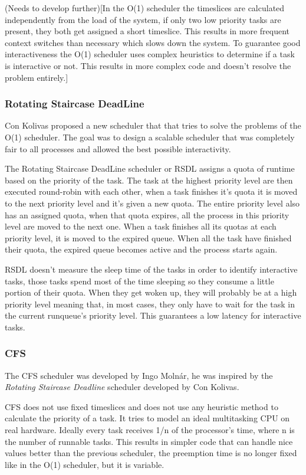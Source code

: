\documentclass[10pt]{book}
\begin{document}
(Needs to develop further)[In the O(1) scheduler the timeslices are calculated independently from the load of the system, if only two low priority tasks are present, they both get assigned a short timeslice. This results in more frequent context switches than necessary which slows down the system. To guarantee good interactiveness the O(1) scheduler uses complex heuristics to determine if a task is interactive or not. This results in more complex code and doesn't resolve the problem entirely.]

\subsubsection{Rotating Staircase DeadLine}

Con Kolivas proposed a new scheduler that that tries to solve the problems of the O(1) scheduler. The goal was to design a scalable scheduler that was completely fair to all processes and allowed the best possible interactivity.

The Rotating Staircase DeadLine scheduler or RSDL assigns a quota of runtime based on the priority of the task. The task at the highest priority level are then executed round-robin with each other, when a task finishes it's quota it is moved to the next priority level and it's given a new quota. The entire priority level also has an assigned quota, when that quota expires, all the process in this priority level are moved to the next one. When a task finishes all its quotas at each priority level, it is moved to the expired queue. When all the task have finished their quota, the expired queue becomes active and the process starts again.

RSDL doesn't measure the sleep time of the tasks in order to identify interactive tasks, those tasks spend most of the time sleeping so they consume a little portion of their quota. When they get woken up, they will probably be at a high priority level meaning that, in most cases, they only have to wait for the task in the current runqueue's priority level. This guarantees a low latency for interactive tasks. 

\subsubsection{CFS}
The CFS scheduler was developed by Ingo Molnár, he was inspired by the \textit{Rotating Staircase Deadline} scheduler developed by Con Kolivas. 

CFS does not use fixed timeslices and does not use any heuristic method to calculate the priority of a task. It tries to model an ideal multitasking CPU on real hardware. Ideally every task receives 1/n of the processor's time, where n is the number of runnable tasks. This results in simpler code that can handle nice values better than the previous scheduler, the preemption time is no longer fixed like in the O(1) scheduler, but it is variable.
\end{document}
